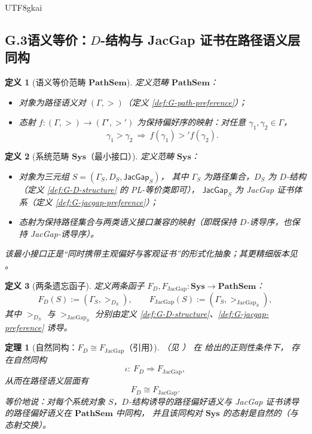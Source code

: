 \documentclass[12pt]{article}
\newtheorem{definition}{定义}[section]
\newtheorem{theorem}{定理}[section]
\begin{document}
\begin{CJK*}{UTF8}{gkai}
\subsection{G.3\;语义等价：$D$-结构与 JacGap 证书在路径语义层同构}

\begin{definition}[语义等价范畴 $\mathbf{PathSem}$]\label{def:G-pathsem}
定义范畴 $\mathbf{PathSem}$：
\begin{itemize}
  \item 对象为路径语义对 $(\Gamma,>)$（定义 \ref{def:G-path-preference}）；
  \item 态射 $f:(\Gamma,>)\to(\Gamma',>')$ 为保持偏好序的映射：对任意 $\gamma_1,\gamma_2\in\Gamma$，
        \[
          \gamma_1>\gamma_2\ \Rightarrow\ f(\gamma_1)>'f(\gamma_2).
        \]
\end{itemize}
\end{definition}

\begin{definition}[系统范畴 $\mathbf{Sys}$（最小接口）]\label{def:G-sys}
定义范畴 $\mathbf{Sys}$：
\begin{itemize}
  \item 对象为三元组 $S=(\Gamma_S, D_S, \mathsf{JacGap}_S)$，
        其中 $\Gamma_S$ 为路径集合，$D_S$ 为 $D$-结构（定义 \ref{def:G-D-structure} 的 PL-等价类即可），
        $\mathsf{JacGap}_S$ 为 JacGap 证书体系（定义 \ref{def:G-jacgap-preference}）；
  \item 态射为保持路径集合与两类语义接口兼容的映射（即既保持 $D$-诱导序，也保持 JacGap-诱导序）。
\end{itemize}
该最小接口正是“同时携带主观偏好与客观证书”的形式化抽象；其更精细版本见 \cite{GZJacGapDStructEquiv}。
\end{definition}

\begin{definition}[两条遗忘函子]\label{def:G-two-functors}
定义两条函子 $F_D,F_{\mathrm{JacGap}}:\mathbf{Sys}\to\mathbf{PathSem}$：
\[
  F_D(S):=(\Gamma_S,>_{D_S}),
  \qquad
  F_{\mathrm{JacGap}}(S):=(\Gamma_S,>_{\mathrm{JacGap}_S}),
\]
其中 $>_{D_S}$ 与 $>_{\mathrm{JacGap}_S}$ 分别由定义 \ref{def:G-D-structure}、\ref{def:G-jacgap-preference} 诱导。
\end{definition}

\begin{theorem}[自然同构：$F_D \cong F_{\mathrm{JacGap}}$（引用）]\label{thm:G-natural-iso}
（见 \cite{GZJacGapDStructEquiv}）
在 \cite{GZJacGapDStructEquiv} 给出的正则性条件下，
存在自然同构
\[
  \iota:\ F_D \Longrightarrow F_{\mathrm{JacGap}},
\]
从而在路径语义层面有
\[
  F_D \cong F_{\mathrm{JacGap}}.
\]
等价地说：对每个系统对象 $S$，$D$-结构诱导的路径偏好语义与 JacGap 证书诱导的路径偏好语义在 $\mathbf{PathSem}$ 中同构，
并且该同构对 $\mathbf{Sys}$ 的态射是自然的（与态射交换）。
\end{theorem}


\end{CJK*}
\end{document}
